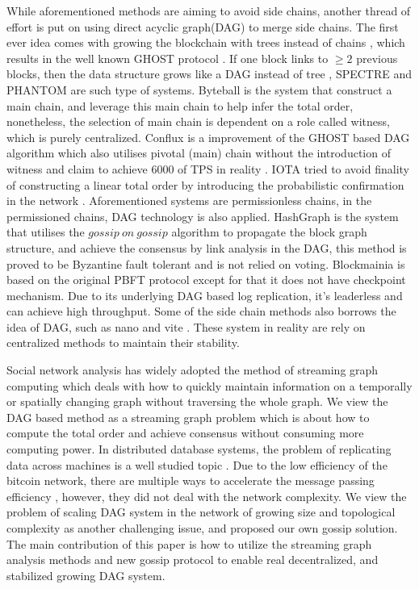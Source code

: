 While aforementioned methods are aiming to avoid side chains, 
another thread of effort is put on using direct acyclic graph(DAG) to merge side chains.
The first ever idea comes with growing the blockchain with trees instead of 
chains \cite{sompolinsky2013accelerating}, which results in the well known GHOST protocol \cite{sompolinsky2015secure}.
If one block links to $\geq 2$ previous blocks, then the data structure grows like a DAG instead of tree \cite{lewenberg2015inclusive}, 
SPECTRE \cite{sompolinsky2016spectre} and PHANTOM \cite{sompolinskyphantom} are such type of systems.
Byteball \cite{churyumov2016byteball} is the system that construct a main chain, 
and leverage this main chain to help infer the total order, nonetheless, 
the selection of main chain is dependent on a role called witness, which is purely centralized.
Conflux is a improvement of the GHOST based DAG algorithm which also utilises pivotal (main) chain 
without the introduction of witness and claim to achieve $6000$ of TPS in reality \cite{li2018scaling}.
IOTA tried to avoid finality of constructing a linear total order by introducing the probabilistic confirmation in the network \cite{popov2016tangle}. 
Aforementioned systems are permissionless chains, in the permissioned chains, DAG technology is also applied. 
HashGraph \cite{baird2016swirlds} is the system that utilises the $gossip\ on\ gossip$ algorithm to propagate the block graph structure, and achieve the
consensus by link analysis in the DAG, this method is proved to be Byzantine fault tolerant and is not relied on voting.
Blockmainia \cite{danezis2018blockmania} is based on the original PBFT protocol except for that it does not have checkpoint mechanism.
Due to its underlying DAG based log replication, it's leaderless and can achieve high throughput.
Some of the side chain methods also borrows the idea of DAG, such as nano \cite{lemahieu2018nano} and vite \cite{liuvite}.
These system in reality are rely on centralized methods to maintain their stability.

Social network analysis has widely adopted the method of streaming graph computing \cite{ediger2011tracking, green2012fast, ediger2012stinger} which deals
with how to quickly maintain information on a temporally or spatially changing graph without traversing the whole graph. 
We view the DAG based method as a streaming graph problem which is about how to compute the total order and achieve consensus without consuming more computing power.
In distributed database systems, the problem of replicating data across machines is a well studied topic \cite{demers1988epidemic}.
Due to the low efficiency of the bitcoin network, there are multiple ways to accelerate the message passing efficiency \cite{klarmanbloxroute}, however, they did not deal with the network complexity. 
We view the problem of scaling DAG system in the network of growing size and topological complexity as another challenging issue, and proposed our own gossip solution.
The main contribution of this paper is how to utilize the streaming graph analysis methods and new gossip protocol to enable real decentralized, and stabilized growing DAG system.
